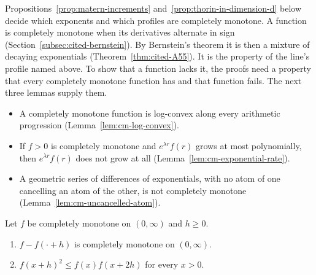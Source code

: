 Propositions~\ref{prop:matern-increments} and~\ref{prop:thorin-in-dimension-d} below decide which
exponents and which profiles are completely monotone. A function is completely monotone when its
derivatives alternate in sign (Section~\ref{subsec:cited-bernstein}). By Bernstein's theorem it is
then a mixture of decaying exponentials (Theorem~\ref{thm:cited-A55}). It is the property of the
line's profile named above. To show that a function lacks it, the
proofs need a property that every completely monotone function has and that function fails. The
next three lemmas supply them.
\begin{itemize}
\item A completely monotone function is log-convex along every arithmetic progression
(Lemma~\ref{lem:cm-log-convex}).
\item If $f > 0$ is completely monotone and $e^{\lambda r}f(r)$ grows at most polynomially, then
$e^{\lambda r}f(r)$ does not grow at all (Lemma~\ref{lem:cm-exponential-rate}).
\item A geometric series of differences of exponentials, with no atom of one cancelling an atom of
the other, is not completely monotone (Lemma~\ref{lem:cm-uncancelled-atom}).
\end{itemize}

\begin{lemma}
\label{lem:cm-log-convex}

Let $f$ be completely monotone on $(0, \infty)$ and $h \ge 0$.
\begin{enumerate}
\item $f - f(\cdot + h)$ is completely monotone on $(0, \infty)$.
\item $f(x + h)^2 \le f(x)f(x + 2h)$ for every $x > 0$.
\end{enumerate}
\end{lemma}

